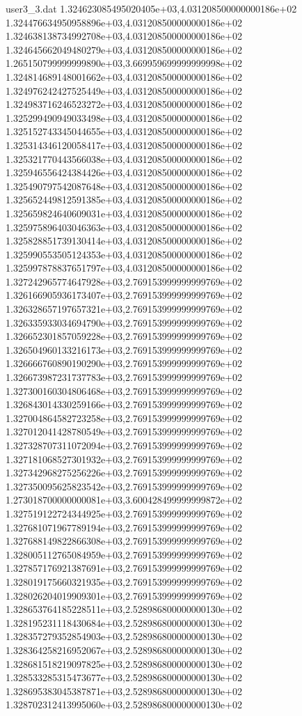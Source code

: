 \begin{filecontents}{user3_3.dat}
1.324623085495020405e+03,4.031208500000000186e+02
1.324476634950958896e+03,4.031208500000000186e+02
1.324638138734992708e+03,4.031208500000000186e+02
1.324645662049480279e+03,4.031208500000000186e+02
1.265150799999999890e+03,3.669959699999999998e+02
1.324814689148001662e+03,4.031208500000000186e+02
1.324976242427525449e+03,4.031208500000000186e+02
1.324983716246523272e+03,4.031208500000000186e+02
1.325299490949033498e+03,4.031208500000000186e+02
1.325152743345044655e+03,4.031208500000000186e+02
1.325314346120058417e+03,4.031208500000000186e+02
1.325321770443566038e+03,4.031208500000000186e+02
1.325946556424384426e+03,4.031208500000000186e+02
1.325490797542087648e+03,4.031208500000000186e+02
1.325652449812591385e+03,4.031208500000000186e+02
1.325659824640609031e+03,4.031208500000000186e+02
1.325975896403046363e+03,4.031208500000000186e+02
1.325828851739130414e+03,4.031208500000000186e+02
1.325990553505124353e+03,4.031208500000000186e+02
1.325997878837651797e+03,4.031208500000000186e+02
1.327242965774647928e+03,2.769153999999999769e+02
1.326166905936173407e+03,2.769153999999999769e+02
1.326328657197657321e+03,2.769153999999999769e+02
1.326335933034694790e+03,2.769153999999999769e+02
1.326652301857059228e+03,2.769153999999999769e+02
1.326504960133216173e+03,2.769153999999999769e+02
1.326666760890190290e+03,2.769153999999999769e+02
1.326673987231737783e+03,2.769153999999999769e+02
1.327300160304806468e+03,2.769153999999999769e+02
1.326843014330259166e+03,2.769153999999999769e+02
1.327004864582723258e+03,2.769153999999999769e+02
1.327012041428780549e+03,2.769153999999999769e+02
1.327328707311072094e+03,2.769153999999999769e+02
1.327181068527301932e+03,2.769153999999999769e+02
1.327342968275256226e+03,2.769153999999999769e+02
1.327350095625823542e+03,2.769153999999999769e+02
1.273018700000000081e+03,3.600428499999999872e+02
1.327519122724344925e+03,2.769153999999999769e+02
1.327681071967789194e+03,2.769153999999999769e+02
1.327688149822866308e+03,2.769153999999999769e+02
1.328005112765084959e+03,2.769153999999999769e+02
1.327857176921387691e+03,2.769153999999999769e+02
1.328019175660321935e+03,2.769153999999999769e+02
1.328026204019909301e+03,2.769153999999999769e+02
1.328653764185228511e+03,2.528986800000000130e+02
1.328195231118430684e+03,2.528986800000000130e+02
1.328357279352854903e+03,2.528986800000000130e+02
1.328364258216952067e+03,2.528986800000000130e+02
1.328681518219097825e+03,2.528986800000000130e+02
1.328533285315473677e+03,2.528986800000000130e+02
1.328695383045387871e+03,2.528986800000000130e+02
1.328702312413995060e+03,2.528986800000000130e+02

\end{filecontents}
